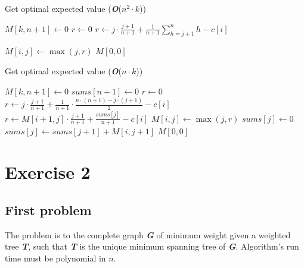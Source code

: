 \documentclass[11pt]{article}
\begin{document}
\begin{minipage}[t]{0.49\textwidth}
\begin{algorithm}[H]
	\caption{Get optimal expected value (\textbf{\textit{O}}($n^2 \cdot k$))}\label{euclid}
	\begin{algorithmic}[1]
		\State $M[k, n+1] \gets 0$
		\State $r \gets 0$
		\State $r \gets j \cdot \frac{j+1}{n+1} + \frac{1}{n+1}\sum\limits_{h = j + 1}^n{h} - c[i]$
		\Else
		\State \begin{varwidth}[t]{\linewidth} $r \gets M[i+1, j] \cdot \frac{j+1}{n+1} + \frac{1}{n+1} \cdot$ \par
			\hskip\algorithmicindent $\sum\limits_{h = j + 1}^n{M[i+1, h]} - c[i]$
		\end{varwidth}
		\EndIf
		\State $M[i, j] \gets \max(j, r)$
		\EndFor		
		\EndFor
		\State \Return $M[0, 0]$
	\end{algorithmic}
\end{algorithm}
\end{minipage}
\hfill
\begin{minipage}[t]{0.49\textwidth}
\begin{algorithm}[H]
	\caption{Get optimal expected value (\textbf{\textit{O}}($n \cdot k$))}\label{euclid}
	\begin{algorithmic}[1]
		\State $M[k, n+1] \gets 0$
		\State $sums[n+1] \gets 0$
		\State $r \gets 0$
			\State $r \gets j \cdot \frac{j+1}{n+1} + \frac{1}{n+1} \cdot \frac{n \cdot (n+1)-j \cdot (j+1)}{2} - c[i]$
		\Else
			\State $r \gets M[i+1, j] \cdot \frac{j+1}{n+1} + \frac{sums[j]}{n+1} - c[i]$
		\EndIf
		\State $M[i, j] \gets \max(j, r)$
			\State $sums[j] \gets 0$
		\Else
			\State $sums[j] \gets sums[j+1] + M[i, j+1]$
		\EndIf
		\EndFor		
		\EndFor
		\State \Return $M[0, 0]$
	\end{algorithmic}
\end{algorithm}
\end{minipage}
\newpage

\section*{Exercise 2}
\subsection*{First problem}
The problem is to the complete graph \textbf{\textit{G}} of minimum weight given a weighted tree \textbf{\textit{T}}, such that  \textbf{\textit{T}} is the unique minimum spanning tree of \textbf{\textit{G}}. Algorithm's run time must be polynomial in $n$.
\end{document}
